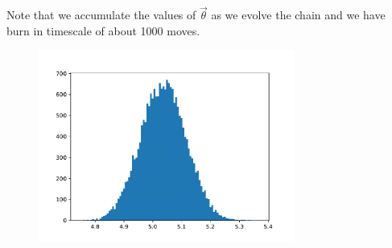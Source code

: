 Note that we accumulate the values of $\vec{\theta}$ as we evolve the chain and we have burn in timescale of about 1000 moves.

%

\begin{figure}
    \centering\includegraphics[width=0.75\textwidth]{code/mcmc_1.pdf}
    \caption{\label{fig:mcmc}}
\end{figure}




